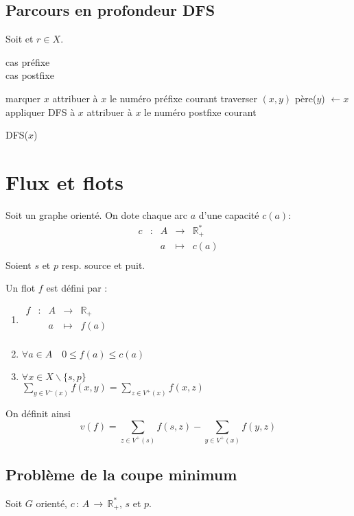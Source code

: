 \documentclass[a4paper, 8pt]{article}
\begin{document}
\begin{multicols*}{3}
\subsection*{Parcours en profondeur DFS}

Soit \GXA et $r\in X$.
\begin{flushright}
{\footnotesize
{\color{blue} cas préfixe} \\
{\color{red} cas postfixe}
}
\end{flushright}
\begin{algorithm}[H]
marquer $x$\;
{\color{blue} attribuer à $x$ le numéro préfixe courant}\;
{
	traverser $(x,y)$\;
	{
		père($y$) $\longleftarrow x$\;
		appliquer DFS à $x$\;
	}
}
{\color{red} attribuer à $x$ le numéro postfixe courant}\;
\caption{DFS($x$)}
\end{algorithm}

\section*{Flux et flots}

Soit \GXA un graphe orienté. On dote chaque arc $a$ d'une capacité $c(a)$:
\[
\begin{array}{cc|ccl}
c & : & A & \to & \mathbb{R}^*_+  \\
 & & a & \mapsto & c(a) \\
\end{array}
\]
Soient $s$ et $p$ resp. source et puit.

Un flot $f$ est défini par : \begin{enumerate}
\item $
\begin{array}{cc|ccl} 
f & : & A & \to & \mathbb{R}_+  \\
 & & a & \mapsto & f(a)\\
\end{array}
$
\item $\forall a \in A\quad 0 \leqslant f(a) \leqslant c(a) $
\item $\forall x \in X\backslash\{s,p\}$\\ 
 $\displaystyle\sum_{y\in V^-(x)}{f(x,y)} = \sum_{z\in V^+(x)}{f(x,z)}$
\end{enumerate}

On définit ainsi
\[v(f) = \displaystyle\sum_{z\in V^+(s)}{f(s,z)} - \sum_{y\in V^+(x)}{f(y,z)} \]

\subsection*{Problème de la coupe minimum}
Soit $G$ orienté, $c\, :\, A\, \rightarrow\, \mathbb{R}^*_+$, $s$ et $p$.


\end{multicols*}
\end{document}
